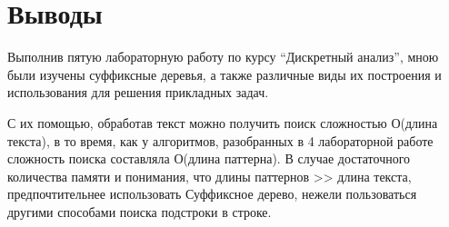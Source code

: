 \section{Выводы}

Выполнив  пятую лабораторную работу по курсу \enquote{Дискретный анализ}, мною были изучены суффиксные деревья, а также различные виды их построения и использования для решения прикладных задач.\newline

С их помощью, обработав текст можно получить поиск сложностью О(длина текста), в то время, как у алгоритмов, разобранных в 4 лабораторной работе сложность поиска составляла О(длина паттерна). В случае достаточного количества памяти и понимания, что длины паттернов >> длина текста, предпочтительнее использовать Суффиксное дерево, нежели пользоваться другими способами поиска подстроки в строке.\newline

\pagebreak
